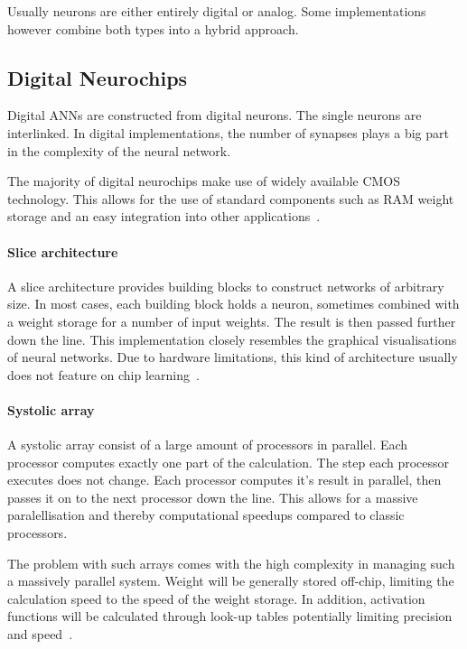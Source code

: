 \documentclass[conference]{IEEEtran}
\begin{document}
    Usually neurons are either entirely digital or analog.
    Some implementations however combine both types into a hybrid approach.

    \subsection{Digital Neurochips}


    Digital ANNs are constructed from digital neurons.
    The single neurons are interlinked.
    In digital implementations, the number of synapses plays a big part in the complexity of the neural network.

    The majority of digital neurochips make use of widely available CMOS technology.
    This allows for the use of standard components such as RAM weight storage and an easy integration into other applications~\cite{dias2004artificial}.

    \paragraph{Slice architecture}
    A slice architecture provides building blocks to construct networks of arbitrary size.
    In most cases, each building block holds a neuron, sometimes combined with a weight storage for a number of input weights.
    The result is then passed further down the line.
    This implementation closely resembles the graphical visualisations of neural networks.
    Due to hardware limitations, this kind of architecture usually does not feature on chip learning~\cite{dias2004artificial}.

    \paragraph{Systolic array}
    A systolic array consist of a large amount of processors in parallel.
    Each processor computes exactly one part of the calculation.
    The step each processor executes does not change.
    Each processor computes it's result in parallel, then passes it on to the next processor down the line.
    This allows for a massive paralellisation and thereby computational speedups compared to classic processors.

    The problem with such arrays comes with the high complexity in managing such a massively parallel system.
    Weight will be generally stored off-chip, limiting the calculation speed to the speed of the weight storage.
    In addition, activation functions will be calculated through look-up tables potentially limiting precision and speed~\cite{dias2004artificial}.
\end{document}
